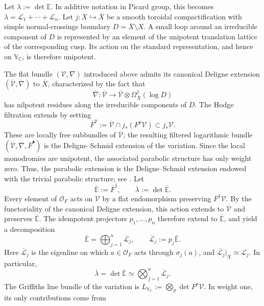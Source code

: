 \documentclass[12 pt]{amsart}
\theoremstyle{definition}
\begin{document}
Let
\(
\lambda:=\det\mathbb E.
\)
In additive notation in Picard group, this becomes
\(
\lambda=\mathcal L_1+\cdots+\mathcal L_n.
\)
Let
\(
j:X\hookrightarrow \overline X
\)
be a smooth toroidal compactification with simple normal-crossings boundary
\(
D=\overline X\setminus X.
\)
A small loop around an irreducible component of \(D\) is represented by an
element of the unipotent translation lattice of the corresponding cusp.
Its action on the standard representation, and hence on
\(\mathbb V_{\mathbb C}\), is therefore unipotent.

The flat bundle \((\mathcal V,\nabla)\) introduced above
admits its canonical
Deligne extension
\(
(\overline{\mathcal V},\overline\nabla)
\)
to \(\overline X\), characterized by the fact that
\[
\overline\nabla:
\overline{\mathcal V}
\longrightarrow
\overline{\mathcal V}\otimes
\Omega^1_{\overline X}(\log D)
\]
has nilpotent residues along the irreducible components of \(D\).
The Hodge filtration extends by setting
\[
\overline F^p
:=
\overline{\mathcal V}\cap j_*(F^p\mathcal V)
\subset j_*\mathcal V.
\]
These are locally free subbundles of \(\overline{\mathcal V}\); the resulting
filtered logarithmic bundle
\(
(\overline{\mathcal V},\overline\nabla,\overline F^\bullet)
\)
is the Deligne--Schmid extension of the variation. Since the local
monodromies are unipotent, the associated parabolic structure has only
weight zero. Thus, the parabolic extension is
the Deligne--Schmid extension endowed with the trivial parabolic structure; see \cite[\S 1.2, \S 2.2]{brunebarbe2020increasing}. Let
\[
\overline{\mathbb E}:=\overline F^1,
\qquad
\overline\lambda:=\det\overline{\mathbb E}.
\]
Every element of \(\mathcal O_F\) acts on \(\mathcal V\) by a flat
endomorphism preserving \(F^1\mathcal V\). By the functoriality of the
canonical Deligne extension, this action extends to
\(\overline{\mathcal V}\) and preserves \(\overline{\mathbb E}\).
The idempotent projectors \(p_1,\ldots,p_n\) therefore extend to
\(\overline{\mathbb E}\), and yield a decomposition
\[
\overline{\mathbb E}
=
\bigoplus_{j=1}^n\overline{\mathcal L}_j,
\qquad
\overline{\mathcal L}_j:=p_j\overline{\mathbb E}.
\]
Here \(\overline{\mathcal L}_j\) is the eigenline on which
\(a\in\mathcal O_F\) acts through \(\sigma_j(a)\), and
\(
\overline{\mathcal L}_j|_X\simeq\mathcal L_j.
\)
In particular,
\[
\overline\lambda
=
\det\overline{\mathbb E}
\simeq
\bigotimes_{j=1}^n\overline{\mathcal L}_j.
\]
The Griffiths line bundle of the variation is
\(
L_{\mathbb V_{\mathbb C}}
:=
\bigotimes_p\det F^p\mathcal V.
\)
In weight one, its only contributions come from
\end{document}
